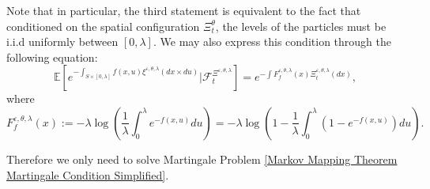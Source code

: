 \documentclass[12pt]{article}
\begin{document}
Note that in particular, the third statement is equivalent to the fact that conditioned on the spatial configuration $\Xi^{\theta}_t$, the levels of the particles must be i.i.d uniformly between $[0,\lambda]$. We may also express this condition through the following equation:
\begin{equation}\label{Markov Mapping Theorem Cox Condition}
\mathbb{E}\left[e^{-\int_{S \times [0,\lambda]} f(x,u) \xi^{\varepsilon,\theta,\lambda}(dx \times du)}\bigg| \mathcal{F}^{\Xi^{\varepsilon,\theta, \lambda}}_t\right]=e^{-\int F^{\varepsilon,\theta,\lambda}_f(x) \Xi^{\varepsilon,\theta,\lambda}_t(dx)},
\end{equation}
where 
$$F^{\varepsilon,\theta,\lambda}_f(x):=-\lambda\log \left(\frac{1}{\lambda}\int_{0}^{\lambda}e^{-f(x,u)}du\right)=-\lambda\log \left(1-\frac{1}{\lambda}\int_{0}^{\lambda}(1-e^{-f(x,u)})du\right).$$

Therefore we only need to solve Martingale Problem \eqref{Markov Mapping Theorem Martingale Condition Simplified}.\\
\end{document}
